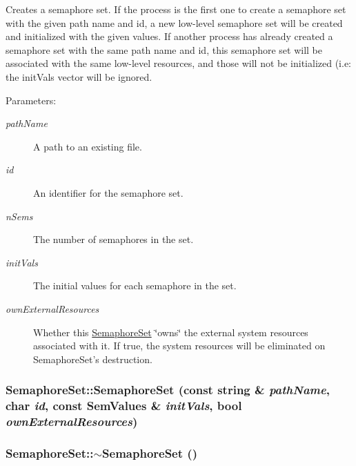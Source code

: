 Creates a semaphore set. If the process is the first one to create a semaphore set with the given path name and id, a new low-level semaphore set will be created and initialized with the given values. If another process has already created a semaphore set with the same path name and id, this semaphore set will be associated with the same low-level resources, and those will not be initialized (i.e: the initVals vector will be ignored.

\begin{Desc}
\item[Parameters:]
\begin{description}
\item[{\em pathName}]A path to an existing file. \item[{\em id}]An identifier for the semaphore set. \item[{\em nSems}]The number of semaphores in the set. \item[{\em initVals}]The initial values for each semaphore in the set. \item[{\em ownExternalResources}]Whether this \hyperlink{classSemaphoreSet}{SemaphoreSet} \char`\"{}owns\char`\"{} the external system resources associated with it. If true, the system resources will be eliminated on SemaphoreSet's destruction. \end{description}
\end{Desc}
\hypertarget{classSemaphoreSet_f2442ffd5943a17f45d54b43e1aaeddc}{
\subsubsection[{SemaphoreSet}]{\setlength{\rightskip}{0pt plus 5cm}SemaphoreSet::SemaphoreSet (const string \& {\em pathName}, \/  char {\em id}, \/  const {\bf SemValues} \& {\em initVals}, \/  bool {\em ownExternalResources})}}
\label{classSemaphoreSet_f2442ffd5943a17f45d54b43e1aaeddc}


\hypertarget{classSemaphoreSet_39f813371f0f7bcf1c826619b69ee818}{
\subsubsection[{$\sim$SemaphoreSet}]{\setlength{\rightskip}{0pt plus 5cm}SemaphoreSet::$\sim$SemaphoreSet ()}}
\label{classSemaphoreSet_39f813371f0f7bcf1c826619b69ee818}


